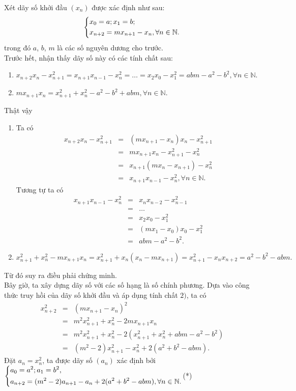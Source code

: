 Xét dãy số khởi đầu $(x_n)$ được xác định như sau:
$$\left\{\begin{aligned}&x_0=a;x_1=b;\\&x_{n+2}=mx_{n+1}-x_n,\forall n\in\mathbb{N}.\end{aligned}\right.$$
trong đó $a$, $b$, $m$ là các số nguyên dương cho trước.\\
Trước hết, nhận thấy dãy số này có các tính chất sau:
\begin{enumerate}[1)]
	\item $x_{n+2}x_n-x^2_{n+1}=x_{n+1}x_{n-1}-x^2_{n}=\ldots=x_2x_0-x^2_1=abm-a^2-b^2,\forall n\in\mathbb{N}.$
	\item $mx_{n+1}x_n=x^2_{n+1}+x^2_{n}-a^2-b^2+abm,\forall n\in\mathbb{N}.$
\end{enumerate}
Thật vậy
\begin{enumerate}[1)]
	\item Ta có
	\begin{eqnarray*}
		x_{n+2}x_n-x^2_{n+1}&=&(mx_{n+1}-x_n)x_n-x^2_{n+1}\\
		&=&mx_{n+1}x_n-x^2_{n+1}-x^2_n\\
		&=&x_{n+1}(mx_n-x_{n+1})-x^2_n\\
		&=&x_{n+1}x_{n-1}-x^2_n,\forall n\in\mathbb{N}.
	\end{eqnarray*}
	Tương tự ta có
	\begin{eqnarray*}
		x_{n+1}x_{n-1}-x^2_n&=&x_nx_{n-2}-x^2_{n-1}\\
		&=&\ldots\\
		&=&x_2x_0-x^2_1\\
		&=&(mx_1-x_0)x_0-x^2_1\\
		&=&abm-a^2-b^2. 
	\end{eqnarray*}
	\item $x^2_{n+1}+x^2_n-mx_{n+1}x_n=x^2_{n+1}+x_n(x_n-mx_{n+1})=x^2_{n+1}-x_nx_{n+2}=a^2-b^2-abm.$
\end{enumerate}
Từ đó suy ra điều phải chứng minh.\\
Bây giờ, ta xây dựng dãy số với các số hạng là số chính phương.
Dựa vào công thức truy hồi của dãy số khởi đầu và áp dụng tính chất $2)$, ta có
\begin{eqnarray*}
	x^2_{n+2}&=&(mx_{n+1}-x_n)^2\\
	&=&m^2x^2_{n+1}+x^2_n-2mx_{n+1}x_n\\
	&=&m^2x^2_{n+1}+x^2_n-2(x^2_{n+1}+x^2_n+abm-a^2-b^2)\\
	&=&(m^2-2)x^2_{n+1}-x^2_{n}+2(a^2+b^2-abm).
\end{eqnarray*}
Đặt $a_n=x^2_n$, ta được dãy số $(a_n)$ xác định bởi\\
$\left\{\begin{aligned}&a_0=a^2;a_1=b^2,\\&a_{n+2}=(m^2-2)a_{n+1}-a_n+2(a^2+b^2-abm),\forall n\in \mathbb{N}.\end{aligned}\right.$\hfill(*)\\
